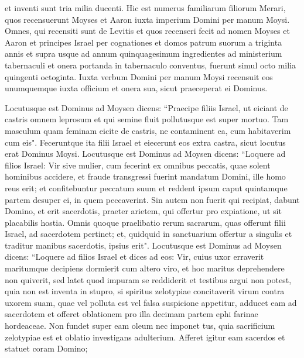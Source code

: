 \begin{biblechapter}
\verse et inventi sunt tria milia ducenti. 
\verse Hic est numerus familiarum filiorum Merari, quos recensuerunt Moyses et Aaron iuxta imperium Domini per manum Moysi. 
\verse Omnes, qui recensiti sunt de Levitis et quos recenseri fecit ad nomen Moyses et Aaron et principes Israel per cognationes et domos patrum suorum 
\verse a triginta annis et supra usque ad annum quinquagesimum ingredientes ad ministerium tabernaculi et onera portanda in tabernaculo conventus, 
\verse fuerunt simul octo milia quingenti octoginta. 
\verse Iuxta verbum Domini per manum Moysi recensuit eos unumquemque iuxta officium et onera sua, sicut praeceperat ei Dominus. 
\end{biblechapter}

\begin{biblechapter}  
\verse Locutusque est Dominus ad Moysen dicens: 
\verse “Praecipe filiis Israel, ut eiciant de castris omnem leprosum et qui semine fluit pollutusque est super mortuo. 
\verse Tam masculum quam feminam eicite de castris, ne contaminent ea, cum habitaverim cum eis". 
\verse Feceruntque ita filii Israel et eiecerunt eos extra castra, sicut locutus erat Dominus Moysi. 
\verse Locutusque est Dominus ad Moysen dicens: 
\verse “Loquere ad filios Israel: Vir sive mulier, cum fecerint ex omnibus peccatis, quae solent hominibus accidere, et fraude transgressi fuerint mandatum Domini, ille homo reus erit; 
\verse et confitebuntur peccatum suum et reddent ipsum caput quintamque partem desuper ei, in quem peccaverint.  
\verse Sin autem non fuerit qui recipiat, dabunt Domino, et erit sacerdotis, praeter arietem, qui offertur pro expiatione, ut sit placabilis hostia. 
\verse Omnis quoque praelibatio rerum sacrarum, quas offerunt filii Israel, ad sacerdotem pertinet; 
\verse et, quidquid in sanctuarium offertur a singulis et traditur manibus sacerdotis, ipsius erit". 
\verse Locutusque est Dominus ad Moysen dicens: 
\verse “Loquere ad filios Israel et dices ad eos: Vir, cuius uxor erraverit maritumque decipiens 
\verse dormierit cum altero viro, et hoc maritus deprehendere non quiverit, sed latet quod impuram se reddiderit et testibus argui non potest, quia non est inventa in stupro, 
\verse si spiritus zelotypiae concitaverit virum contra uxorem suam, quae vel polluta est vel falsa suspicione appetitur, 
\verse adducet eam ad sacerdotem et offeret oblationem pro illa decimam partem ephi farinae hordeaceae. Non fundet super eam oleum nec imponet tus, quia sacrificium zelotypiae est et oblatio investigans adulterium. 
\verse Afferet igitur eam sacerdos et statuet coram Domino; 

\end{biblechapter}
